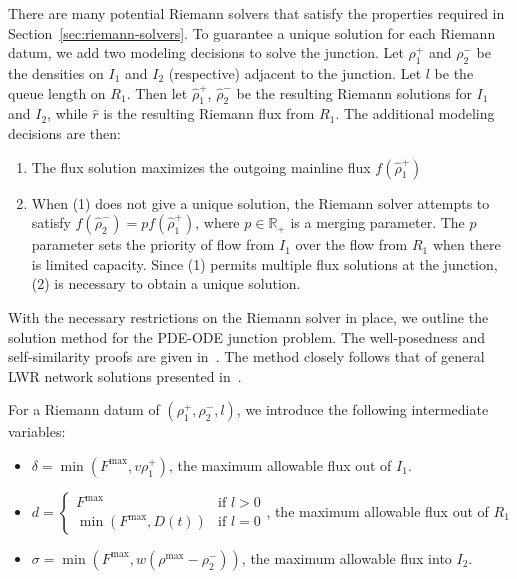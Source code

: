 There are many potential Riemann solvers that satisfy the properties required in Section~\ref{sec:riemann-solvers}.
To guarantee a unique solution for each Riemann datum, we add two modeling decisions to solve the junction. Let $\rho_1^+$ and $\rho_2^-$ be the densities on $I_1$ and $I_2$ (respective) adjacent to the junction. Let $l$ be the queue length on $R_1$. Then let $\hat{\rho}_1^+$, $\hat{\rho}_2^-$ be the resulting Riemann solutions for $I_1$  and $I_2$, while $\hat{r}$ is the resulting Riemann flux from $R_1$. The additional modeling decisions are then:
\begin{enumerate}
\item The flux solution maximizes the outgoing mainline flux $f\left(\hat{\rho}_1^+\right)$
\item When (1) does not give a unique solution, the Riemann solver attempts to satisfy $f\left(\hat{\rho}_2^-\right)=p f\left(\hat{\rho}_1^+\right)$,
where $p\in\mathbb{R}_{+}$ is a merging parameter. The $p$ parameter sets the priority of flow from $I_1$ over the flow from $R_1$ when there is limited capacity. Since (1) permits multiple flux solutions at the junction, (2) is necessary to obtain a unique solution.
\end{enumerate}

With the necessary restrictions on the Riemann solver in place, we outline the solution method for the PDE-ODE junction problem. The well-posedness and self-similarity proofs are given in~\cite{delle2014pde}. The method closely follows that of general LWR network solutions presented in~\cite{garavello2006traffic}.

For a Riemann datum of $\left(\rho_1^+, \rho_2^-, l\right)$, we introduce the following intermediate variables:

\begin{itemize}
	\item $\delta = \min\left(F^{\max}, v \rho_1^+\right)$, the maximum allowable flux out of $I_1$.
	\item $d =
	\begin{cases}
	F^{\max} & \text{if } l > 0 \\
	\min\left(F^{\max}, D\left(t\right)\right) & \text{if } l = 0
	\end{cases}$, the maximum allowable flux out of $R_1$
	\item $\sigma = \min\left(F^{\max}, w \left(\rho^{\max} - \rho_2^-\right)\right)$, the maximum allowable flux into $I_2$.
\end{itemize}

